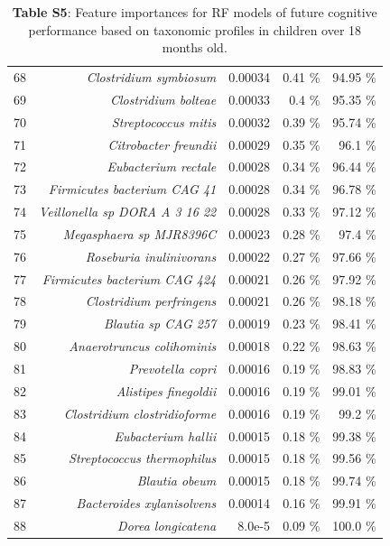 \documentclass{article}
\begin{document}
\begin{table}
\begin{centering}
\begin{tabular}{|r|r|r|r|r|}
  68 & \textit{Clostridium symbiosum} & 0.00034 & 0.41 \% & 94.95 \% \\
  69 & \textit{Clostridium bolteae} & 0.00033 & 0.4 \% & 95.35 \% \\
  70 & \textit{Streptococcus mitis} & 0.00032 & 0.39 \% & 95.74 \% \\
  71 & \textit{Citrobacter freundii} & 0.00029 & 0.35 \% & 96.1 \% \\
  72 & \textit{Eubacterium rectale} & 0.00028 & 0.34 \% & 96.44 \% \\
  73 & \textit{Firmicutes bacterium CAG 41} & 0.00028 & 0.34 \% & 96.78 \% \\
  74 & \textit{Veillonella sp DORA A 3 16 22} & 0.00028 & 0.33 \% & 97.12 \% \\
  75 & \textit{Megasphaera sp MJR8396C} & 0.00023 & 0.28 \% & 97.4 \% \\
  76 & \textit{Roseburia inulinivorans} & 0.00022 & 0.27 \% & 97.66 \% \\
  77 & \textit{Firmicutes bacterium CAG 424} & 0.00021 & 0.26 \% & 97.92 \% \\
  78 & \textit{Clostridium perfringens} & 0.00021 & 0.26 \% & 98.18 \% \\
  79 & \textit{Blautia sp CAG 257} & 0.00019 & 0.23 \% & 98.41 \% \\
  80 & \textit{Anaerotruncus colihominis} & 0.00018 & 0.22 \% & 98.63 \% \\
  81 & \textit{Prevotella copri} & 0.00016 & 0.19 \% & 98.83 \% \\
  82 & \textit{Alistipes finegoldii} & 0.00016 & 0.19 \% & 99.01 \% \\
  83 & \textit{Clostridium clostridioforme} & 0.00016 & 0.19 \% & 99.2 \% \\
  84 & \textit{Eubacterium hallii} & 0.00015 & 0.18 \% & 99.38 \% \\
  85 & \textit{Streptococcus thermophilus} & 0.00015 & 0.18 \% & 99.56 \% \\
  86 & \textit{Blautia obeum} & 0.00015 & 0.18 \% & 99.74 \% \\
  87 & \textit{Bacteroides xylanisolvens} & 0.00014 & 0.16 \% & 99.91 \% \\
  88 & \textit{Dorea longicatena} & 8.0e-5 & 0.09 \% & 100.0 \% \\\hline
\end{tabular}
\caption*{
  \textbf{Table S5}: Feature importances for RF models of future cognitive performance
  based on taxonomic profiles in children over 18 months old.
}
\end{centering}
\end{table}
\end{document}
